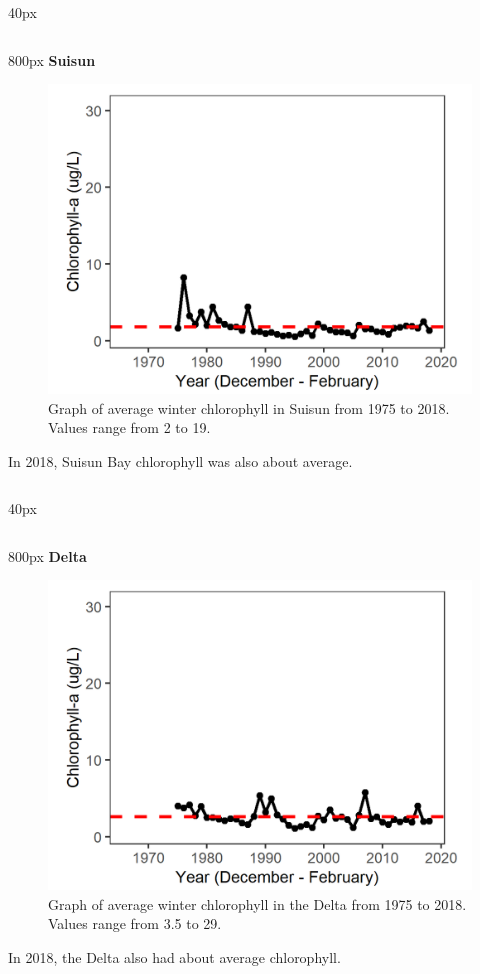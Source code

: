\documentclass[
]{book}
\begin{document}
\begin{column}{40px\textwidth}
~
\end{column}

\begin{column}{800px\textwidth}
\textbf{Suisun}

\begin{figure}
\includegraphics[width=15.25in]{figures/chla_sswinter} \caption{Graph of average winter chlorophyll in Suisun from 1975 to 2018. Values range from 2 to 19.}\label{fig:unnamed-chunk-159}
\end{figure}

In 2018, Suisun Bay chlorophyll was also about average.
\end{column}

\begin{column}{40px\textwidth}
~
\end{column}

\begin{column}{800px\textwidth}
\textbf{Delta}

\begin{figure}
\includegraphics[width=15.25in]{figures/chla_dtwinter} \caption{Graph of average winter chlorophyll in the Delta from 1975 to 2018. Values range from 3.5 to 29.}\label{fig:unnamed-chunk-160}
\end{figure}

In 2018, the Delta also had about average chlorophyll.
\end{column}
\end{document}
